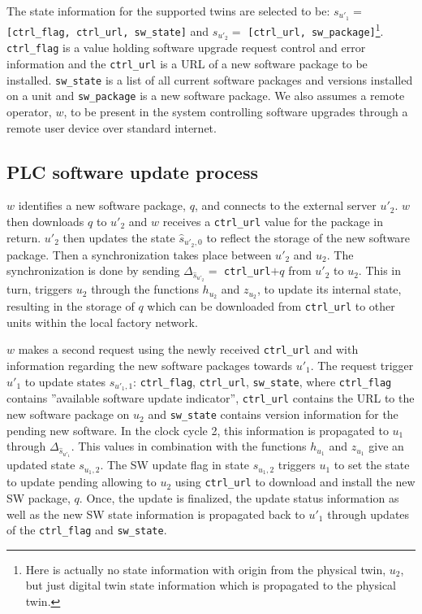 The state information for the supported twins are selected to be: $s_{u'_1} =$ \texttt{[ctrl\_flag, ctrl\_url, sw\_state]} and  $s_{u'_2} = $ \texttt{[ctrl\_url, sw\_package]}\footnote{Here is actually no state information with origin from the physical twin, $u_2$, but just digital twin state information which is propagated to the physical twin.}.  \texttt{ctrl\_flag} is a value holding software upgrade request control and error information and the \texttt{ctrl\_url} is a URL of a new software package to be installed. \texttt{sw\_state} is a list of all current software packages and versions installed on a unit and \texttt{sw\_package} is a new software package.  We also assumes a remote operator, $w$, to be present in the system controlling software upgrades through a remote user device over standard internet. 


\subsection{PLC software update process}
$w$ identifies a new software package, $q$, and connects to the external server $u'_2$.  $w$ then downloads $q$ to $u'_2$ and $w$  receives a \texttt{ctrl\_url} value for the package in return. $u'_2$ then updates the state $\hat{s}_{u'_2,0}$ to reflect the storage of the new software package. Then a synchronization takes place between $u'_2$ and $u_2$. The synchronization is done by sending $\Delta_{\hat{s}_{u'_2}} = $ \texttt{ctrl\_url}$+ q$ from $u'_2$ to $u_2$. This in turn, triggers $u_2$ through the functions $h_{u_2}$ and $z_{u_2}$, to update its internal state, resulting in the storage of $q$ which can be downloaded from \texttt{ctrl\_url} to other units within the local factory network. 

$w$ makes a second request using the newly received \texttt{ctrl\_url} and with information regarding the new software packages towards $u'_1$. The request trigger $u'_1$ to update states $s_{u'_1,1}$: \texttt{ctrl\_flag}, \texttt{ctrl\_url}, \texttt{sw\_state}, where \texttt{ctrl\_flag} contains ''available software update indicator'', \texttt{ctrl\_url} contains the URL to the new software package on $u_2$ and \texttt{sw\_state} contains version information for the pending new software. In the clock cycle 2, this information is propagated to $u_1$ through  $\Delta_{\hat{s}_{u'_1}}$. This values in combination with the functions $h_{u_1}$ and $z_{u_1}$ give an updated state $s_{u_1,2}$.
The SW update flag in state $s_{u_1,2}$ triggers $u_1$ to set the state to update pending allowing to $u_2$ using \texttt{ctrl\_url} to download and install the new SW package, $q$. Once, the update is finalized, the update status information as well as the new SW state information is propagated back to $u'_1$ through updates of the \texttt{ctrl\_flag} and \texttt{sw\_state}.

